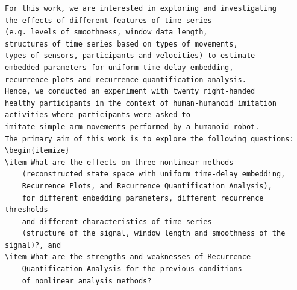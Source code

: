 \documentclass[10pt]{article}
\begin{document}
\begin{verbatim}
For this work, we are interested in exploring and investigating  
the effects of different features of time series 
(e.g. levels of smoothness, window data length,
structures of time series based on types of movements, 
types of sensors, participants and velocities) to estimate 
embedded parameters for uniform time-delay embedding, 
recurrence plots and recurrence quantification analysis.
Hence, we conducted an experiment with twenty right-handed 
healthy participants in the context of human-humanoid imitation 
activities where participants were asked to 
imitate simple arm movements performed by a humanoid robot.
The primary aim of this work is to explore the following questions:
\begin{itemize}
\item What are the effects on three nonlinear methods 
	(reconstructed state space with uniform time-delay embedding, 
	Recurrence Plots, and Recurrence Quantification Analysis), 
	for different embedding parameters, different recurrence thresholds 
	and different characteristics of time series 
	(structure of the signal, window length and smoothness of the signal)?, and 
\item What are the strengths and weaknesses of Recurrence
	Quantification Analysis for the previous conditions
	of nonlinear analysis methods?

\end{verbatim}
\end{document}
